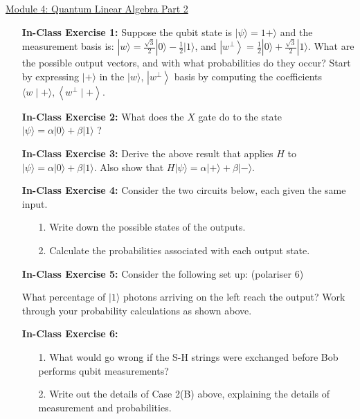 \documentclass[main.tex]{subfiles}
\begin{document}
\href{https://www2.seas.gwu.edu/~simhaweb/quantum/modules/module4/module4.html}{Module 4: Quantum Linear Algebra Part 2}

\begin{enumerate}

\item[] \textbf{In-Class Exercise 1:} Suppose the qubit state is $|\psi\rangle=1+\rangle$ and the measurement basis is: $|w\rangle=\frac{\sqrt{3}}{2}|0\rangle-\frac{1}{2}|1\rangle$, and $\left|w^{\perp}\right\rangle=\frac{1}{2}|0\rangle+\frac{\sqrt{3}}{2}|1\rangle$. What are the possible output vectors, and with what probabilities do they occur? Start by expressing $|+\rangle$ in the $|w\rangle$, $\left|w^{\perp}\right\rangle$ basis by computing the coefficients $\langle w \mid+\rangle,\left\langle w^{\perp} \mid+\right\rangle$.

\item[] \textbf{In-Class Exercise 2:} What does the $X$ gate do to the state $|\psi\rangle=\alpha|0\rangle+\beta|1\rangle$ ?

\item[] \textbf{In-Class Exercise 3:} Derive the above result that applies $H$ to $|\psi\rangle=\alpha|0\rangle+\beta|1\rangle$. Also show that $H|\psi\rangle=\alpha|+\rangle+\beta|-\rangle$.

\item[] \textbf{In-Class Exercise 4:} Consider the two circuits below, each given the same input.

    \begin{enumerate}
        \item[1.] Write down the possible states of the outputs.
        \item[2.] Calculate the probabilities associated with each output state.
    \end{enumerate}

\item[] \textbf{In-Class Exercise 5:} Consider the following set up: (polariser 6)

What percentage of $|1\rangle$ photons arriving on the left reach the output? Work through your probability calculations as shown above.

\item[] \textbf{In-Class Exercise 6:}

    \begin{enumerate}
        \item[1.] What would go wrong if the S-H strings were exchanged before Bob performs qubit measurements?
        \item[2.] Write out the details of Case 2(B) above, explaining the details of measurement and probabilities.
    \end{enumerate}


\end{enumerate}
\end{document}
